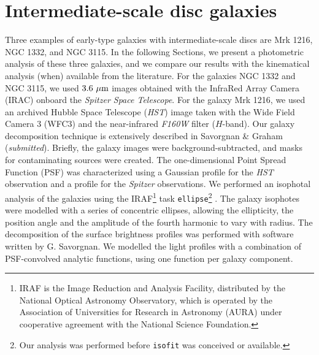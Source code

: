 \documentclass[useAMS,usenatbib,article]{mn2e}
\begin{document}
\section{Intermediate-scale disc galaxies}
\label{sec:gal}
Three examples of early-type galaxies with intermediate-scale discs are Mrk 1216, NGC 1332, and NGC 3115. 
In the following Sections, we present a photometric analysis of these three galaxies, 
and we compare our results with the kinematical analysis (when) available from the literature. 
For the galaxies NGC 1332 and NGC 3115, we used $3.6~\rm \mu m$ images obtained with the InfraRed Array Camera (IRAC) 
onboard the \emph{Spitzer Space Telescope}. 
For the galaxy Mrk 1216, we used an archived Hubble Space Telescope (\emph{HST}) image  
taken with the Wide Field Camera 3 (WFC3) and the near-infrared \emph{F160W} filter ($H$-band). 
Our galaxy decomposition technique is extensively described in Savorgnan \& Graham (\emph{submitted}).
Briefly, the galaxy images were background-subtracted, and masks for contaminating sources were created. 
The one-dimensional Point Spread Function (PSF) was characterized using a Gaussian profile for the \emph{HST} observation 
and a \cite{moffat1969} profile for the \emph{Spitzer} observations.
We performed an isophotal analysis of the galaxies using the IRAF\footnote{IRAF 
is the Image Reduction and Analysis Facility, distributed by the National Optical Astronomy Observatory, 
which is operated by the Association of Universities for Research in Astronomy (AURA) 
under cooperative agreement with the National Science Foundation.} task {\tt ellipse}\footnote{Our analysis 
was performed before {\tt isofit} \citep{ciambur2015} was conceived or available.} \citep{taskellipse}. 
The galaxy isophotes were modelled with a series of concentric ellipses, 
allowing the ellipticity, the position angle and the amplitude of the fourth harmonic to vary with radius.  
The decomposition of the surface brightness profiles was performed with software written by G. Savorgnan.
We modelled the light profiles with a combination of PSF-convolved analytic functions, 
using one function per galaxy component. 
\end{document}
